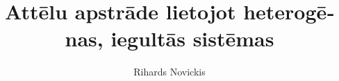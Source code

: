 \usepackage{titlesec}

\usepackage{fontspec}
\usepackage{xunicode}
\usepackage{xltxtra}

\usepackage{polyglossia}
\setdefaultlanguage{latvian}

\title{Attēlu apstrāde lietojot heterogēnas, iegultās sistēmas}
\author{Rihards Novickis}
\newcommand{\advisor}{
	  Zinātniskais vadītājs\\
      Datorzinātņu doktors\\
      \large{\MakeUppercase{M. Greitāns}}
}
\def \student_number{111REB756}
\def \programm_description{Elektronikas maģistra programmas students}
